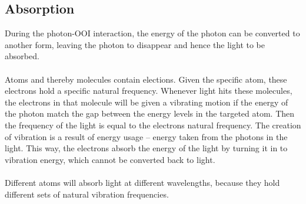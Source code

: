 \subsection{Absorption} \label{sec:abs}
During the photon-OOI interaction, the energy of the photon can be converted to another form, leaving the photon to disappear and hence the light to be absorbed. 
\\\\
Atoms and thereby molecules contain elections. Given the specific atom, these electrons hold a specific natural frequency. Whenever light hits these molecules, the electrons in that molecule will be given a vibrating motion if the energy of the photon match the gap between the energy levels in the targeted atom. Then the frequency of the light is equal to the electrons natural frequency. The creation of vibration is a result of energy usage – energy taken from the photons in the light. This way, the electrons absorb the energy of the light by turning it in to vibration energy, which cannot be converted back to light. 
\\\\
Different atoms will absorb light at different wavelengths, because they hold different sets of natural vibration frequencies. 


